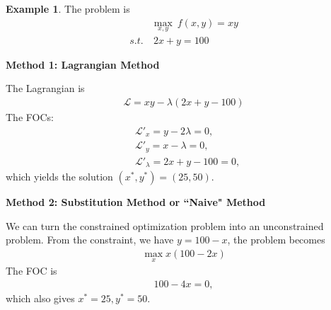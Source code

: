 \documentclass[11pt,a4paper]{book}
\theoremstyle{definition}\newtheorem{definition}{Definition}
\theoremstyle{definition}\newtheorem{fact}{Fact}
\theoremstyle{definition}\newtheorem{remark}{Remark}
\theoremstyle{definition}\newtheorem{ex}{Ex.}
\theoremstyle{definition}\newtheorem{project}{Project}
\theoremstyle{definition}\newtheorem{problem}{Problem}
\theoremstyle{definition}\newtheorem{example}{Example}
\numberwithin{theorem}{section}
\numberwithin{corollary}{chapter}
\numberwithin{assumption}{chapter}
\numberwithin{definition}{chapter}
\numberwithin{prop}{chapter}
\numberwithin{notation}{chapter}
\numberwithin{problem}{chapter}
\numberwithin{example}{chapter}
\numberwithin{fact}{chapter}
\numberwithin{ex}{chapter}
\begin{document}
		\begin{example}
		The problem is
		\begin{align*}
			& \max_{x,y} \ f(x,y) = xy \\
			s.t. & \ 2x + y = 100           
		\end{align*}
		
		\textbf{Method 1: Lagrangian Method}
		
		
		The Lagrangian is
		\begin{align*}
			\mathcal{L} = xy - \lambda (2x + y - 100) 
		\end{align*}
		The FOCs:
		\begin{align*}
			& \mathcal{L}'_x = y - 2\lambda = 0,       \\
			& \mathcal{L}'_y = x - \lambda = 0,        \\
			& \mathcal{L}'_\lambda = 2x + y - 100 = 0, 
		\end{align*}
		which yields the solution $(x^*,y^*) = (25,50)$. 
		
		\textbf{Method 2: Substitution Method or ``Naive" Method}
		
		
		We can turn the constrained optimization problem into an unconstrained problem. From the constraint, we have $y = 100 -x$, the problem becomes
		\begin{align*}
			\max_{x} x (100-2x) 
		\end{align*}
		The FOC is
		\begin{align*}
			100 - 4x = 0, 
		\end{align*}
		which also gives $x^*=25, y^* = 50$.
		
	\end{example}

	
\end{document}
